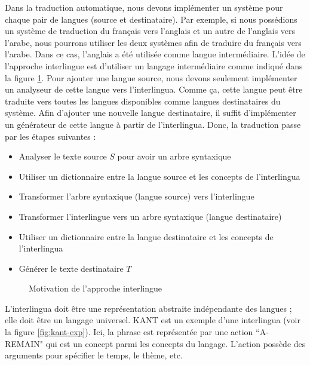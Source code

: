 \documentclass{KodeBook}
\begin{document}
Dans la traduction automatique, nous devons implémenter un système pour chaque pair de langues (source et destinataire). 
Par exemple, si nous possédions un système de traduction du français vers l'anglais et un autre de l'anglais vers l'arabe, nous pourrons utiliser les deux systèmes afin de traduire du français vers l'arabe. 
Dans ce cas, l'anglais a été utilisée comme langue intermédiaire. 
L'idée de l'approche interlingue est d'utiliser un langage intermédiaire comme indiqué dans la figure \ref{fig:mt-interlangue}.
Pour ajouter une langue source, nous devons seulement implémenter un analyseur de cette langue vers l'interlingua. 
Comme ça, cette langue peut être traduite vers toutes les langues disponibles comme langues destinataires du système. 
Afin d'ajouter une nouvelle langue destinataire, il suffit d'implémenter un générateur de cette langue à partir de l'interlingua. 
Donc, la traduction passe par les étapes suivantes :
\begin{itemize}
	\item Analyser le texte source $S$ pour avoir un arbre syntaxique
	\item Utiliser un dictionnaire entre la langue source et les concepts de l'interlingua 
	\item Transformer l'arbre syntaxique (langue source) vers l'interlingue
	\item Transformer l'interlingue vers un arbre syntaxique (langue destinataire)
	\item Utiliser un dictionnaire entre la langue destinataire et les concepts de l'interlingua 
	\item Générer le texte destinataire $T$
\end{itemize}

\begin{figure}[ht]
	\centering
	\caption{Motivation de l'approche interlingue}
	\label{fig:mt-interlangue}
\end{figure}

L'interlingua doit être une représentation abstraite indépendante des langues ; elle doit être un langage universel.
KANT \cite{98-czuba-al} est un exemple d'une interlingua (voir la figure \ref{fig:kant-exp}).
Ici, la phrase est représentée par une action ``A-REMAIN" qui est un concept parmi les concepts du langage.
L'action possède des arguments pour spécifier le temps, le thème, etc.
\end{document}
